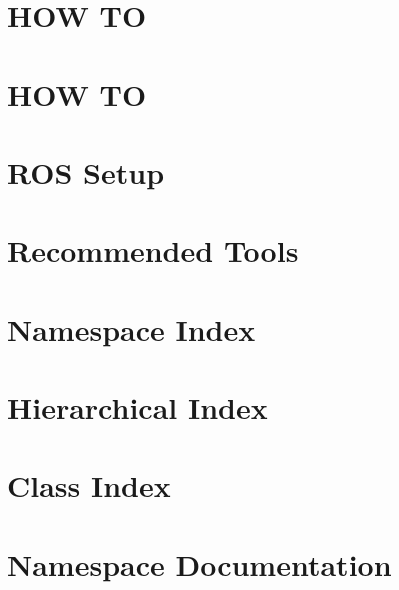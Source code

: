 \documentclass[twoside]{book}
\newcommand{\+}{\discretionary{\mbox{\scriptsize$\hookleftarrow$}}{}{}}
\begin{document}
\chapter{H\+OW TO}
\label{md__home_rnb__projects_rnb-planning_docs__h_o_w__t_o}

\chapter{H\+OW TO}
\label{md__home_rnb__projects_rnb-planning_docs__h_o_w__t_o__u_s_e}

\chapter{R\+OS Setup}
\label{md__home_rnb__projects_rnb-planning_docs__r_o_s__s_e_t_u_p}

\chapter{Recommended Tools}
\label{md__home_rnb__projects_rnb-planning_docs__s_u_p_p_l_e_m_e_n_t__r_e_a_d_m_e}

\chapter{Namespace Index}

\chapter{Hierarchical Index}

\chapter{Class Index}

\chapter{Namespace Documentation}



\end{document}
